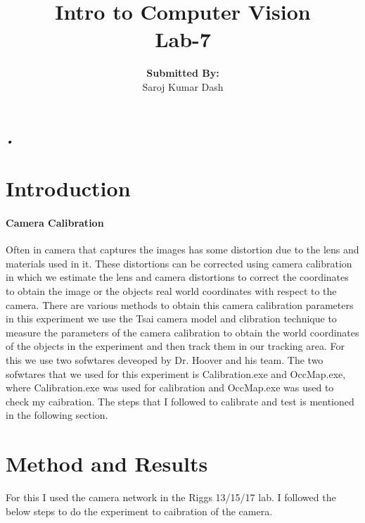 \documentclass{article}
\title{\textbf{Intro to Computer Vision \\Lab-7}\vfill{}}
\author{\textbf{Submitted By:}\\Saroj Kumar Dash}
\begin{document}
	\begin{titlepage}
		\maketitle
	\end{titlepage}
	
\newpage

\tableofcontents

\newpage	

\textsl{•}\section{Introduction}
\paragraph{Camera Calibration}
Often in camera that captures the images has some distortion due to the lens and materials used in it. These distortions can be corrected using camera calibration in which we estimate the lens and camera distortions to correct the coordinates to obtain the image or the objects real world coordinates with respect to the camera. There are various methods to obtain this camera calibration parameters in this experiment we use the Tsai camera model and clibration technique to measure the parameters of the camera calibration to obtain the world coordinates of the objects in the experiment and then track them in our tracking area. For this we use two sofwtares deveoped by Dr. Hoover and his team. The two sofwtares that we used for this experiment is Calibration.exe and OccMap.exe, where Calibration.exe was used for calibration and OccMap.exe was used to check my caibration. The steps that I followed to calibrate and test is mentioned in the following section.

\section{Method and Results}
For this I used the camera network in the Riggs 13/15/17 lab. I followed the below steps to do the experiment to caibration of the camera.
\end{document}
